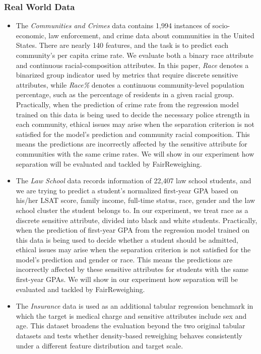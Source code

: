 \subsubsection{Real World Data}
\begin{itemize}
    \item The \emph{Communities and Crimes} \cite{redmond2002data} data contains 1,994 instances of socio-economic, law enforcement, and crime data about communities in the United States. There are nearly 140 features, and the task is to predict each community's per capita crime rate.
    We evaluate both a binary race attribute and continuous racial-composition attributes. In this paper, \emph{Race} denotes a binarized group indicator used by metrics that require discrete sensitive attributes, while \emph{Race\%} denotes a continuous community-level population percentage, such as the percentage of residents in a given racial group. Practically, when the prediction of crime rate from the regression model trained on this data is being used to decide the necessary police strength in each community, ethical issues may arise when the separation criterion is not satisfied for the model's prediction and community racial composition. This means the predictions are incorrectly affected by the sensitive attribute for communities with the same crime rates. We will show in our experiment how separation will be evaluated and tackled by FairReweighing.
    

    \item The \emph{Law School} \cite{wightman1998lsac} data records information of 22,407 law school students, and we are trying to predict a student's normalized first-year GPA based on his/her LSAT score, family income, full-time status, race, gender and the law school cluster the student belongs to. In our experiment, we treat race as a discrete sensitive attribute, divided into black and white students. 
    Practically, when the prediction of first-year GPA from the regression model trained on this data is being used to decide whether a student should be admitted, ethical issues may arise when the separation criterion is not satisfied for the model's prediction and gender or race. This means the predictions are incorrectly affected by these sensitive attributes for students with the same first-year GPAs. We will show in our experiment how separation will be evaluated and tackled by FairReweighing.

    \item The \emph{Insurance} data is used as an additional tabular regression benchmark in which the target is medical charge and sensitive attributes include sex and age. This dataset broadens the evaluation beyond the two original tabular datasets and tests whether density-based reweighing behaves consistently under a different feature distribution and target scale.
    
\end{itemize}

